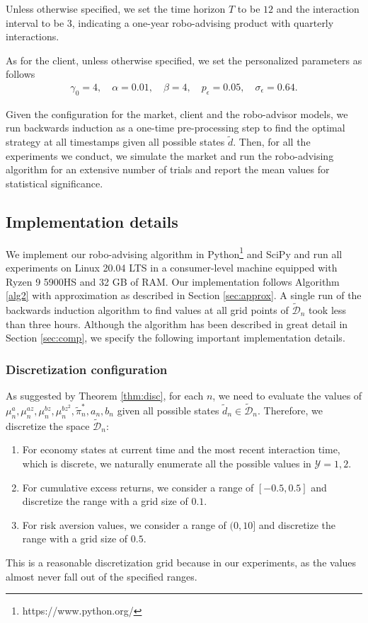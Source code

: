 Unless otherwise specified, we set the time horizon $T$ to be $12$ and the interaction interval to be $3$, indicating a one-year robo-advising product with quarterly interactions.

As for the client, unless otherwise specified, we set the personalized parameters as follows\begin{align*}
    \gamma_0=4,\quad \alpha=0.01,\quad \beta=4,\quad p_\epsilon=0.05,\quad \sigma_\epsilon=0.64.
\end{align*}

Given the configuration for the market, client and the robo-advisor models, we run backwards induction as a one-time pre-processing step to find the optimal strategy at all timestamps given all possible states $\tilde d$. Then, for all the experiments we conduct, we simulate the market and run the robo-advising algorithm for an extensive number of trials and report the mean values for statistical significance.

\subsection{Implementation details}
We implement our robo-advising algorithm in Python\footnote{https://www.python.org/} and SciPy \cite{2020SciPy} and run all experiments on Linux 20.04 LTS in a consumer-level machine equipped with Ryzen 9 5900HS and 32 GB of RAM. Our implementation follows Algorithm \ref{alg2} with approximation as described in Section \ref{sec:approx}. A single run of the backwards induction algorithm to find values at all grid points of $\tilde{\mathcal{D}}_n$ took less than three hours. Although the algorithm has been described in great detail in Section \ref{sec:comp}, we specify the following important implementation details.

\subsubsection{Discretization configuration}
As suggested by Theorem \ref{thm:disc}, for each $n$, we need to evaluate the values of $\mu_n^a,\mu_n^{az},\mu_n^{bz},\mu_n^{bz^2},\tilde\pi_n^*,\allowbreak a_n,b_n$ given all possible states $\tilde d_n\in\tilde{\mathcal D}_n$. Therefore, we discretize the space $\tilde{\mathcal D}_n$:\begin{enumerate}
    \item For economy states at current time and the most recent interaction time, which is discrete, we naturally enumerate all the possible values in $\mathcal Y={1,2}$.
    \item For cumulative excess returns, we consider a range of $[-0.5,0.5]$ and discretize the range with a grid size of $0.1$.
    \item For risk aversion values, we consider a range of $(0,10]$ and discretize the range with a grid size of $0.5$.
\end{enumerate} This is a reasonable discretization grid because in our experiments, as the values almost never fall out of the specified ranges.

